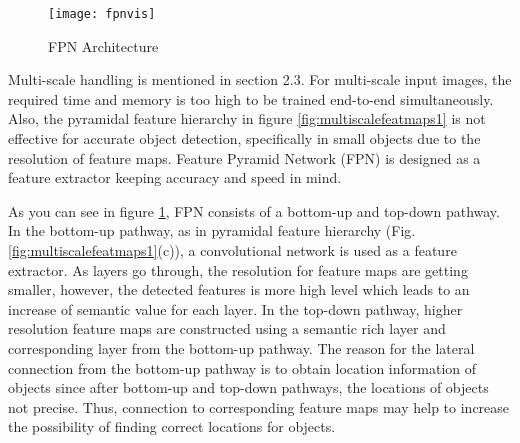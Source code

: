 \documentclass{article}
\begin{document}
\setlength{\parindent}{6ex}

\begin{figure}
    \centering
    \texttt{[image: fpnvis]}
    \caption{FPN Architecture}
    \label{fig:fpnvis1}
\end{figure}

\indent

Multi-scale handling is mentioned in section 2.3. For multi-scale input images, 
the required time and memory is too high to be trained end-to-end simultaneously. 
Also, the pyramidal feature hierarchy in figure \ref{fig:multiscalefeatmaps1} is not 
effective for accurate object detection, specifically in small objects due to the 
resolution of feature maps. Feature Pyramid Network (FPN) \cite{fpncite} is designed as a 
feature extractor keeping accuracy and speed in mind. \par 

As you can see in figure \ref{fig:fpnvis1}, FPN consists of a bottom-up and 
top-down pathway. In the bottom-up pathway, as in pyramidal feature hierarchy 
(Fig. \ref{fig:multiscalefeatmaps1}(c)), a convolutional network is used as 
a feature extractor. As layers go through, the resolution for feature maps 
are getting smaller, however, the detected features is more high level which 
leads to an increase of semantic value for each layer. In the top-down pathway, 
higher resolution feature maps are constructed using a semantic rich layer and 
corresponding layer from the bottom-up pathway. The reason for the lateral 
connection from the bottom-up pathway is to obtain location information of 
objects since after bottom-up and top-down pathways, the locations of 
objects not precise. Thus, connection to corresponding feature maps 
may help to increase the possibility of finding correct locations for 
objects. 
\end{document}
